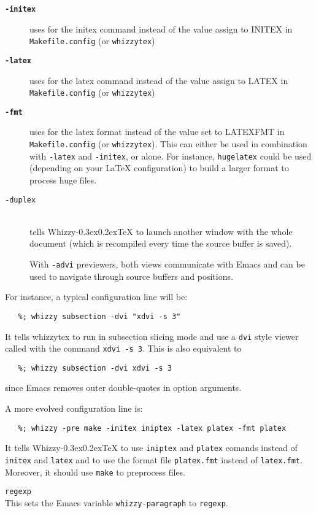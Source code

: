 \documentclass[12pt]{article}
\makeatletter
\let \lst \verb
\def \whizzy {{Whizzy\kern -0.3ex\raise 0.2ex\hbox{\let \@\relax\TeX}}}
\makeatother
\begin{document}
\begin{description}
\begin{description}
\item[{\bf {\tt -initex }}]\indent

uses  for the initex command instead of the value 
assign to INITEX in \lst"Makefile.config" (or \lst"whizzytex")

\item[{\bf {\tt -latex }}]\indent

uses  for the latex command instead of the value 
assign to LATEX in \lst"Makefile.config" (or \lst"whizzytex")

\item[{\bf {\tt -fmt }}]\indent

uses  for the latex format instead
of the value set to LATEXFMT in \lst"Makefile.config" (or \lst"whizzytex"). 
This can either be used in combination with \lst"-latex" and \lst"-initex",
or alone. For instance,
\lst"hugelatex" could be used (depending on your {\LaTeX} configuration) to
build a larger format to process huge files.

\item[\texttt{-duplex}]\indent\\

tells {\whizzy} to launch another window with the whole document (which is
recompiled every time the source buffer is saved).

With \lst"-advi" previewers, both views  communicate with Emacs and can be
used to navigate through source buffers and positions.
\end{description}

For instance, a typical configuration line will be:
\begin{verbatim}
   %; whizzy subsection -dvi "xdvi -s 3"
\end{verbatim}
It tells whizzytex to run in subsection slicing mode and use a \lst"dvi"
style viewer called with the command
\lst"xdvi -s 3". This is also equivalent to
\begin{verbatim}
   %; whizzy subsection -dvi xdvi -s 3
\end{verbatim}
since Emacs removes outer double-quotes in option arguments. 

A more evolved configuration line is:
\begin{verbatim}
   %; whizzy -pre make -initex iniptex -latex platex -fmt platex
\end{verbatim}
It tells {\whizzy} to use \lst"iniptex" and \lst"platex" comands instead
of \lst"initex" and \lst"latex" and to use the format file \lst"platex.fmt" 
instead of \lst"latex.fmt". Moreover, it should use \lst"make" to preprocess
files.

\item[whizzy-paragraph] \texttt{regexp}\\
This sets the Emacs variable \lst"whizzy-paragraph" to \texttt{regexp}.
\end{description} 
\end{document}
